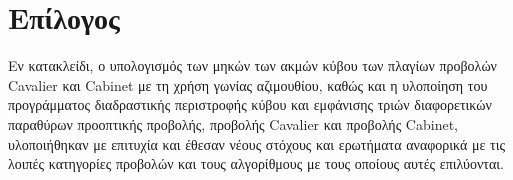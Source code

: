 
\chapter*{Επίλογος}

Εν κατακλείδι, ο υπολογισμός των μηκών των ακμών κύβου των πλαγίων προβολών \textlatin{Cavalier} και \textlatin{Cabinet} με τη χρήση γωνίας αζιμουθίου, καθώς και η υλοποίηση του προγράμματος διαδραστικής περιστροφής κύβου και εμφάνισης τριών διαφορετικών παραθύρων προοπτικής προβολής, προβολής \textlatin{Cavalier} και προβολής \textlatin{Cabinet}, υλοποιήθηκαν με επιτυχία και έθεσαν νέους στόχους και ερωτήματα αναφορικά με τις λοιπές κατηγορίες προβολών και τους αλγορίθμους με τους οποίους αυτές επιλύονται.